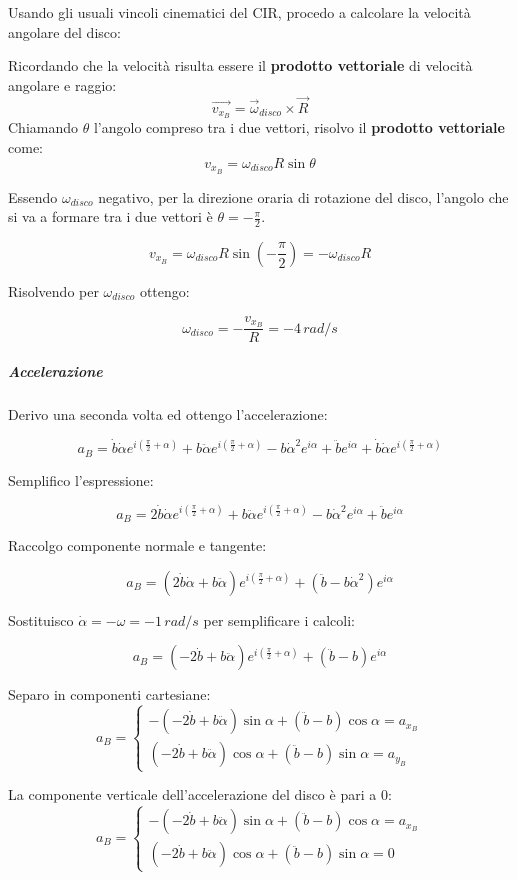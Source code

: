 \documentclass[main.tex]{subfiles}
\begin{document}
Usando gli usuali vincoli cinematici del CIR, procedo a calcolare la velocità angolare del disco:

Ricordando che la velocità risulta essere il \textbf{prodotto vettoriale} di velocità angolare e raggio:
\[
	\vec{v_{x_B}} = \vec{\omega}_{disco}\times\vec{R}
\]
Chiamando $\theta$ l'angolo compreso tra i due vettori, risolvo il \textbf{prodotto vettoriale} come:
\[
	v_{x_B} = \omega_{disco}R\sin\theta
\]

Essendo $\omega_{disco}$ negativo, per la direzione oraria di rotazione del disco, l'angolo che si va a formare tra i due vettori è $\theta=-\frac{\pi}{2}$.

\[
	v_{x_B} = \omega_{disco}R\sin(-\frac{\pi}{2}) = -\omega_{disco}R
\]

Risolvendo per $\omega_{disco}$ ottengo:

\[
	\omega_{disco} = -\frac{v_{x_B} }{R} = -4\,rad/s
\]

\subparagraph{Accelerazione}
Derivo una seconda volta ed ottengo l'accelerazione:

\[
	a_B =  \dot{b}\dot{\alpha}e^{i(\frac{\pi}{2}+\alpha)} + b\ddot{\alpha}e^{i(\frac{\pi}{2}+\alpha)} - b\dot{\alpha}^2e^{i\alpha} + \ddot{b}e^{i\alpha} + \dot{b}\dot{\alpha}e^{i(\frac{\pi}{2}+\alpha)}
\]

Semplifico l'espressione:

\[
	a_B =  2\dot{b}\dot{\alpha}e^{i(\frac{\pi}{2}+\alpha)} + b\ddot{\alpha}e^{i(\frac{\pi}{2}+\alpha)} - b\dot{\alpha}^2e^{i\alpha} + \ddot{b}e^{i\alpha}
\]

Raccolgo componente normale e tangente:

\[
	a_B =  (2\dot{b}\dot{\alpha} + b\ddot{\alpha})e^{i(\frac{\pi}{2}+\alpha)} +(\ddot{b}- b\dot{\alpha}^2)e^{i\alpha}
\]

Sostituisco $\dot{\alpha} = -\omega = -1\,rad/s$ per semplificare i calcoli:

\[
	a_B =  (-2\dot{b} + b\ddot{\alpha})e^{i(\frac{\pi}{2}+\alpha)} +(\ddot{b}- b)e^{i\alpha}
\]

Separo in componenti cartesiane:
\[
a_B = \begin{cases}
	-(-2\dot{b} + b\ddot{\alpha})\sin\alpha + (\ddot{b}- b)\cos\alpha = a_{x_B}\\
	(-2\dot{b} + b\ddot{\alpha})\cos\alpha + (\ddot{b}- b)\sin\alpha = a_{y_B}
\end{cases}
\]

La componente verticale dell'accelerazione del disco è pari a 0:
\[
a_B = \begin{cases}
	-(-2\dot{b} + b\ddot{\alpha})\sin\alpha + (\ddot{b}- b)\cos\alpha = a_{x_B}\\
	(-2\dot{b} + b\ddot{\alpha})\cos\alpha + (\ddot{b}- b)\sin\alpha = 0
\end{cases}
\]
\end{document}
